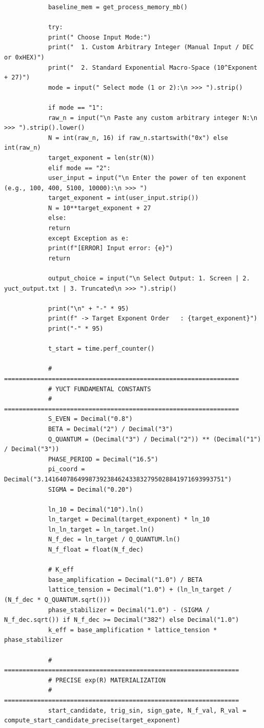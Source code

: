 \documentclass[12pt,a4paper]{article}
\theoremstyle{remark}
\begin{document}
\begin{tcolorbox}
\begin{lstlisting}
			baseline_mem = get_process_memory_mb()
			
			try:
			print(" Choose Input Mode:")
			print("  1. Custom Arbitrary Integer (Manual Input / DEC or 0xHEX)")
			print("  2. Standard Exponential Macro-Space (10^Exponent + 27)")
			mode = input(" Select mode (1 or 2):\n >>> ").strip()
			
			if mode == "1":
			raw_n = input("\n Paste any custom arbitrary integer N:\n >>> ").strip().lower()
			N = int(raw_n, 16) if raw_n.startswith("0x") else int(raw_n)
			target_exponent = len(str(N))
			elif mode == "2":
			user_input = input("\n Enter the power of ten exponent (e.g., 100, 400, 5100, 10000):\n >>> ")
			target_exponent = int(user_input.strip())
			N = 10**target_exponent + 27
			else:
			return
			except Exception as e:
			print(f"[ERROR] Input error: {e}")
			return
			
			output_choice = input("\n Select Output: 1. Screen | 2. yuct_output.txt | 3. Truncated\n >>> ").strip()
			
			print("\n" + "-" * 95)
			print(f" -> Target Exponent Order   : {target_exponent}")
			print("-" * 95)
			
			t_start = time.perf_counter()
			
			# ================================================================
			# YUCT FUNDAMENTAL CONSTANTS
			# ================================================================
			S_EVEN = Decimal("0.8")
			BETA = Decimal("2") / Decimal("3")
			Q_QUANTUM = (Decimal("3") / Decimal("2")) ** (Decimal("1") / Decimal("3"))
			PHASE_PERIOD = Decimal("16.5")
			pi_coord = Decimal("3.1416407864998739238462433832795028841971693993751")
			SIGMA = Decimal("0.20")
			
			ln_10 = Decimal("10").ln()
			ln_target = Decimal(target_exponent) * ln_10
			ln_ln_target = ln_target.ln()
			N_f_dec = ln_target / Q_QUANTUM.ln()
			N_f_float = float(N_f_dec)
			
			# K_eff
			base_amplification = Decimal("1.0") / BETA
			lattice_tension = Decimal("1.0") + (ln_ln_target / (N_f_dec * Q_QUANTUM.sqrt()))
			phase_stabilizer = Decimal("1.0") - (SIGMA / N_f_dec.sqrt()) if N_f_dec >= Decimal("382") else Decimal("1.0")
			k_eff = base_amplification * lattice_tension * phase_stabilizer
			
			# ================================================================
			# PRECISE exp(R) MATERIALIZATION
			# ================================================================
			start_candidate, trig_sin, sign_gate, N_f_val, R_val = compute_start_candidate_precise(target_exponent)
			

\end{lstlisting}
\end{tcolorbox}
\end{document}
